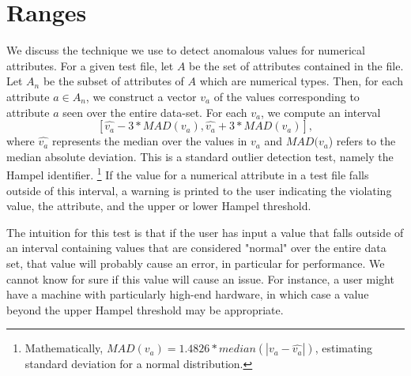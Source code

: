 
\section{Ranges}
\label{sec-learn-ranges}

We discuss the technique we use to detect anomalous values for numerical attributes. For a given 
test file, let $A$ be the set of attributes contained in the file. Let $A_n$ be the subset of attributes 
of $A$ which are numerical types. Then, for each attribute $a \in A_n$, we construct a vector $v_a$ of the 
values corresponding to attribute $a$ seen over the entire data-set. For each $v_a$, we compute 
an interval  $$[\hat{v_a} - 3*MAD(v_a), \hat{v_a} + 3*MAD(v_a)],$$ 
where $\hat{v_a}$ represents the median over the values in $v_a$ and $MAD(v_a$) refers to the 
median absolute deviation. This is a standard outlier detection test, namely the Hampel identifier. 
\footnote{Mathematically, $MAD(v_a) = 1.4826* median(|v_a - \hat{v_a}|)$, estimating standard deviation 
for a normal distribution.} If the value for a numerical attribute in a test file 
falls outside of this interval, a warning is printed to the user indicating the violating value, 
the attribute, and the upper or lower Hampel threshold. 

The intuition for this test is that if the user has input a value that falls outside of an 
interval containing values that are considered "normal" over the entire data set, 
that value will probably cause an error, in particular for performance. We cannot know for sure
if this value will cause an issue. For instance, a user might have a machine with 
particularly high-end hardware, in which case a value beyond the upper Hampel threshold may be appropriate. 
